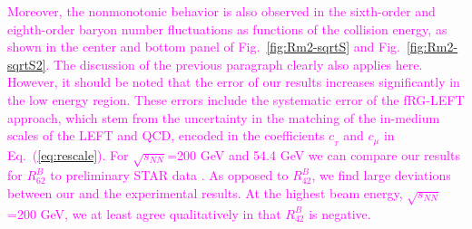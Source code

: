 \documentclass[%
reprint,
superscriptaddress,
showpacs,preprintnumbers,
 amsmath,amssymb,
 aps,
prd,
]{revtex4-1}
\def\Fig#1{Fig.~\ref{#1}} \def\Tab#1{Tab.~\ref{#1}}
\def\Eq#1{Eq.~(\ref{#1})}
\newcommand{\colfab}[1]{\textcolor{magenta}{#1}}
\begin{document}
\colfab{
Moreover, the nonmonotonic behavior is also observed in the sixth-order and eighth-order baryon number fluctuations as functions of the collision energy, as shown in the center and bottom panel of \Fig{fig:Rm2-sqrtS} and \Fig{fig:Rm2-sqrtS2}. 
\colfab{The discussion of the previous paragraph clearly also applies here.}
However, it should be noted that the error of our results increases significantly in the low energy region. These errors include the systematic error of the fRG-LEFT approach, which stem from the uncertainty in the matching of the in-medium scales of the LEFT and QCD, encoded in the coefficients $c_{_{T}}$ and $c_{\mu}$ in \Eq{eq:rescale}. %
For $\sqrt{s_{NN}}$=200 GeV and 54.4 GeV we can compare our results for $R^{B}_{62}$ to preliminary STAR data \cite{Nonaka:2020crv,Pandav:2020uzx}. As opposed to $R^{B}_{42}$, we find large deviations between our and the experimental results. At the highest beam energy, $\sqrt{s_{NN}}$=200 GeV, we at least agree qualitatively in that $R^{B}_{42}$ is negative.
}



 

\end{document}
